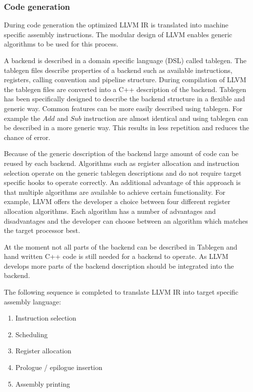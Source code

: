 \subsubsection{Code generation}
During code generation the optimized LLVM IR is translated into machine specific assembly instructions. The modular design of LLVM enables generic algorithms to be used for this process. 

A backend is described in a domain specific language (DSL) called tablegen. The tablegen files describe properties of a backend such as available instructions, registers, calling convention and pipeline structure. During compilation of LLVM the tablegen files are converted into a C++ description of the backend. Tablegen has been specifically designed to describe the backend structure in a flexible and generic way. Common features can be more easily described using tablegen. For example the $Add$ and $Sub$ instruction are almost identical and using tablegen can be described in a more generic way. This results in less repetition and reduces the chance of error.

Because of the generic description of the backend large amount of code can be reused by each backend. Algorithms such as register allocation and instruction selection operate on the generic tablegen descriptions and do not require target specific hooks to operate correctly.
An additional advantage of this approach is that multiple algorithms are available to achieve certain functionality. For example, LLVM offers the developer a choice between four different register allocation algorithms. Each algorithm has a number of advantages and disadvantages and the developer can choose between an algorithm which matches the target processor best.

At the moment not all parts of the backend can be described in Tablegen and hand written C++ code is still needed for a backend to operate. As LLVM develops more parts of the backend description should be integrated into the backend. 

The following sequence is completed to translate LLVM IR into target specific assembly language:
\begin{enumerate}
\item Instruction selection
\item Scheduling
\item Register allocation
\item Prologue / epilogue insertion
\item Assembly printing
\end{enumerate}


\acresetall
